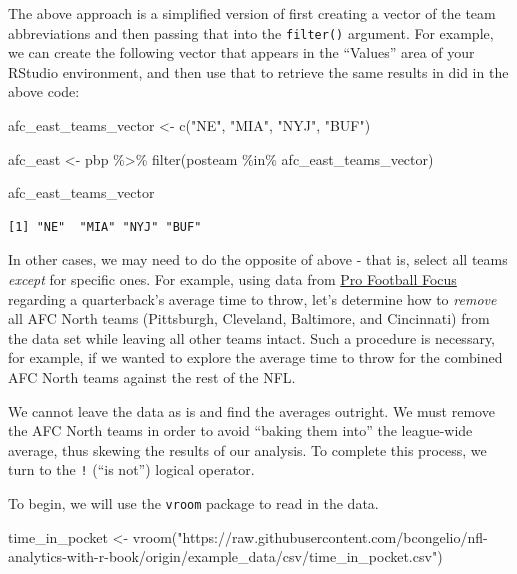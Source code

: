 \documentclass[
  letterpaper,
]{krantz}
\newenvironment{Shaded}{\begin{snugshade}}{\end{snugshade}}
\newcommand{\FunctionTok}[1]{\textcolor[rgb]{0.28,0.35,0.67}{#1}}
\newcommand{\NormalTok}[1]{\textcolor[rgb]{0.00,0.23,0.31}{#1}}
\newcommand{\OtherTok}[1]{\textcolor[rgb]{0.00,0.23,0.31}{#1}}
\newcommand{\SpecialCharTok}[1]{\textcolor[rgb]{0.37,0.37,0.37}{#1}}
\newcommand{\StringTok}[1]{\textcolor[rgb]{0.13,0.47,0.30}{#1}}
\begin{document}
The above approach is a simplified version of first creating a vector of
the team abbreviations and then passing that into the \texttt{filter()}
argument. For example, we can create the following vector that appears
in the ``Values'' area of your RStudio environment, and then use that to
retrieve the same results in did in the above code:

\begin{Shaded}
\begin{Highlighting}[]
\NormalTok{afc\_east\_teams\_vector }\OtherTok{\textless{}{-}} \FunctionTok{c}\NormalTok{(}\StringTok{"NE"}\NormalTok{, }\StringTok{"MIA"}\NormalTok{, }\StringTok{"NYJ"}\NormalTok{, }\StringTok{"BUF"}\NormalTok{)}

\NormalTok{afc\_east }\OtherTok{\textless{}{-}}\NormalTok{ pbp }\SpecialCharTok{\%\textgreater{}\%}
  \FunctionTok{filter}\NormalTok{(posteam }\SpecialCharTok{\%in\%}\NormalTok{ afc\_east\_teams\_vector)}

\NormalTok{afc\_east\_teams\_vector}
\end{Highlighting}
\end{Shaded}

\begin{verbatim}
[1] "NE"  "MIA" "NYJ" "BUF"
\end{verbatim}

In other cases, we may need to do the opposite of above - that is,
select all teams \emph{except} for specific ones. For example, using
data from \href{pff.com}{Pro Football Focus} regarding a quarterback's
average time to throw, let's determine how to \emph{remove} all AFC
North teams (Pittsburgh, Cleveland, Baltimore, and Cincinnati) from the
data set while leaving all other teams intact. Such a procedure is
necessary, for example, if we wanted to explore the average time to
throw for the combined AFC North teams against the rest of the NFL.

We cannot leave the data as is and find the averages outright. We must
remove the AFC North teams in order to avoid ``baking them into'' the
league-wide average, thus skewing the results of our analysis. To
complete this process, we turn to the \texttt{!} (``is not'') logical
operator.

To begin, we will use the \texttt{vroom} package to read in the data.

\begin{Shaded}
\begin{Highlighting}[]
\NormalTok{time\_in\_pocket }\OtherTok{\textless{}{-}}
  \FunctionTok{vroom}\NormalTok{(}\StringTok{"https://raw.githubusercontent.com/bcongelio/nfl{-}analytics{-}with{-}r{-}book/origin/example\_data/csv/time\_in\_pocket.csv"}\NormalTok{)}
\end{Highlighting}
\end{Shaded}
\end{document}
